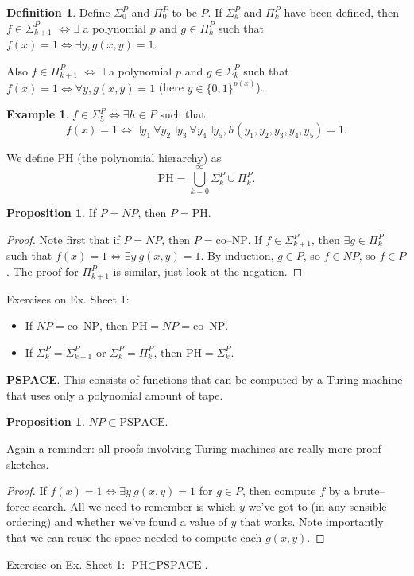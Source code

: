 \documentclass{article}
\theoremstyle{definition}
\newtheorem{prop}[theorem]{Proposition}
\newtheorem{example}{Example}[section]
\newtheorem{defn}{Definition}[section]
\begin{document}
\begin{defn}
    Define $\Sigma_{0}^P$ and $\Pi_0^P$ to be $P$. If $\Sigma_{k}^P$ and $\Pi_k^P$ have been defined, then $f \in \Sigma_{k+1}^P$ $\iff \exists $ a polynomial $p$ and $g \in \Pi_k^P$ such that $f(x)=1 \iff \exists y, g(x,y) = 1$. 
    \vspace{1mm}
     
    Also $f \in \Pi_{k+1}^P$ $\iff \exists $ a polynomial $p$ and $g \in \Sigma_k^P$  such that $f(x)=1 \iff \forall  y, g(x,y) = 1$ (here $y \in \{0,1\}^{p(x)}$).
\end{defn}
\begin{example}
    $f \in \Sigma_{5}^P \iff \exists h \in P$ such that $$f(x)=1 \iff \exists y_1 ~\forall y_2 \exists y_3 ~\forall y_4 \exists y_5, h(y_1,y_2,y_3,y_4,y_5)=1.$$
\end{example}
We define PH (the polynomial hierarchy) as \[
\text{PH} = \bigcup_{k=0}^{\infty} \Sigma_k^P \cup \Pi_k^P.
\]
\begin{prop}
    If $P = NP$, then $P = \text{PH}$.
\end{prop}
\begin{proof}
    Note first that if $P = NP$, then $P = \text{co--NP}$. If $f \in \Sigma_{k+1}^P$, then $\exists g \in \Pi_k^P$ such that $f(x)=1 \iff \exists y~ g(x,y)=1$. By induction, $g \in P$, so $f \in NP$, so $f \in P$. The proof for $\Pi_{k+1}^P$ is similar, just look at the negation.
\end{proof}
Exercises on Ex. Sheet 1: 
\begin{itemize}
    \item If $NP = \text{co--NP}$, then $\text{PH} = NP = \text{co--NP}$.
    \item If $\Sigma_k^P = \Sigma_{k+1}^P$ or $\Sigma_k^P = \Pi_k^P$, then $\text{PH} = \Sigma_k^P$.
\end{itemize}

\vspace{1mm}
 
\textbf{PSPACE}. This consists of functions that can be computed by a Turing machine that uses only a polynomial amount of tape.
\begin{prop}
    $NP \subset \text{PSPACE}$.
\end{prop}
Again a reminder: all proofs involving Turing machines are really more proof sketches.
\begin{proof}
    If $f(x)=1 \iff \exists y~g(x,y)=1$ for $g \in P$, then compute $f$ by a brute--force search. All we need to remember is which $y$ we've got to (in any sensible ordering) and whether we've found a value of $y$ that works. Note importantly that we can reuse the space needed to compute each $g(x,y)$.
\end{proof}
Exercise on Ex. Sheet 1: $\text{PH} \subset \text{PSPACE}$.
\vspace{1mm}
 
\end{document}
